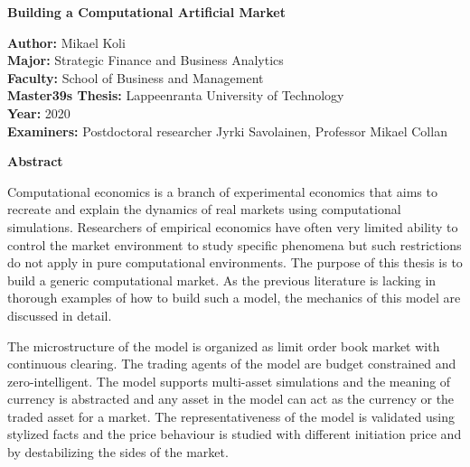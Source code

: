 \thispagestyle{plain}
\begin{center}
    \Large
    \textbf{Building a Computational Artificial Market}
        
    \vspace{0.4cm}
        
    \vspace{0.4cm}
    
    \begin{flushleft}
        \normalsize
        \textbf{Author:} Mikael Koli \\
        \textbf{Major:} Strategic Finance and Business Analytics \\
        \textbf{Faculty:} School of Business and Management \\
        \textbf{Master\char39s Thesis:} Lappeenranta University of Technology \\
        \textbf{Year:} 2020 \\
        \textbf{Examiners:} Postdoctoral researcher Jyrki Savolainen, Professor Mikael Collan
    \end{flushleft}
        
    \vspace{0.5cm}
    \textbf{Abstract}
\end{center}

Computational economics is a branch of experimental economics that aims to 
recreate and explain the dynamics of real markets using computational simulations. Researchers of
empirical economics have often very limited ability to control the market environment 
to study specific phenomena but such restrictions do not apply in pure computational
environments. The purpose of this thesis is to build a generic computational market. As the
previous literature is lacking in thorough examples of how to build such a model, the mechanics of this
model are discussed in detail. 

The microstructure of the model is organized as limit order book market with continuous 
clearing. The trading agents of the model are budget constrained and zero-intelligent. 
The model supports multi-asset simulations and the meaning of currency is 
abstracted and any asset in the model can act as the currency or the traded asset for a market. 
The representativeness of the model is validated using stylized facts and the price behaviour 
is studied with different initiation price and by destabilizing the sides of the market. 

